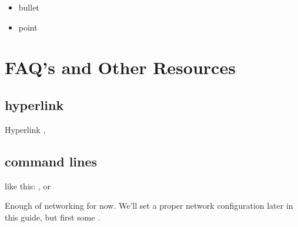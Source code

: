 \documentclass[letterpaper,10pt,openany,oneside,english]{sphinxmanual}
\begin{document}
\begin{itemize}
\item {} 
bullet

\item {} 
point

\end{itemize}


\section{FAQ’s and Other Resources}
\label{\detokenize{faq:faq-s-and-other-resources}}\label{\detokenize{faq::doc}}

\subsection{hyperlink}
\label{\detokenize{faq:hyperlink}}
Hyperlink ,


\subsection{command lines}
\label{\detokenize{faq:command-lines}}
like this: ,  or

Enough of networking for now. We’ll set a proper network configuration later in this guide, but first some .
\end{document}
